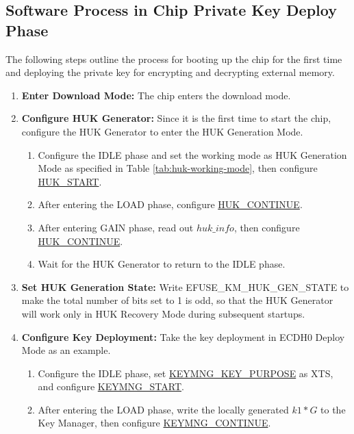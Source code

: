 \documentclass[main\_\_EN.tex]{subfiles}
\begin{document}
\subsection{Software Process in Chip Private Key Deploy Phase}

The following steps outline the process for booting up the chip for the first time and deploying the private key for encrypting and decrypting external memory.

\begin{enumerate}
    \item \textbf{Enter Download Mode:} The chip enters the download mode.
    \item \textbf{Configure HUK Generator:} Since it is the first time to start the chip, configure the HUK Generator to enter the HUK Generation Mode. 
    \begin{enumerate}
        \item Configure the IDLE phase and set the working mode as HUK Generation Mode as specified in Table \ref{tab:huk-working-mode}, then configure \hyperref[fielddesc:HUKSTART]{HUK\_START}.
        \item After entering the LOAD phase, configure \hyperref[fielddesc:HUKCONTINUE]{HUK\_CONTINUE}.
        \item After entering GAIN phase, read out \hyperref[para:hukinfo]{\begin{math}huk\_info\end{math}}, then configure \hyperref[fielddesc:HUKCONTINUE]{HUK\_CONTINUE}.
        \item Wait for the HUK Generator to return to the IDLE phase.
    \end{enumerate}
    \item \textbf{Set HUK Generation State:} Write EFUSE\_KM\_HUK\_GEN\_STATE to make the total number of bits set to 1 is odd, so that the HUK Generator will work only in HUK Recovery Mode during subsequent startups.
    \item \textbf{Configure Key Deployment:} Take the key deployment in ECDH0 Deploy Mode as an example.
    \begin{enumerate}
        \item Configure the IDLE phase, set \hyperref[fielddesc:KEYMNGKEYPURPOSE]{KEYMNG\_KEY\_PURPOSE} as XTS, and configure \hyperref[fielddesc:KEYMNGSTART]{KEYMNG\_START}.
        \item After entering the LOAD phase, write the locally generated \begin{math}k1*G\end{math} to the Key Manager, then configure \hyperref[fielddesc:KEYMNGCONTINUE]{KEYMNG\_CONTINUE}.

\end{enumerate}
\end{enumerate}
\end{document}
